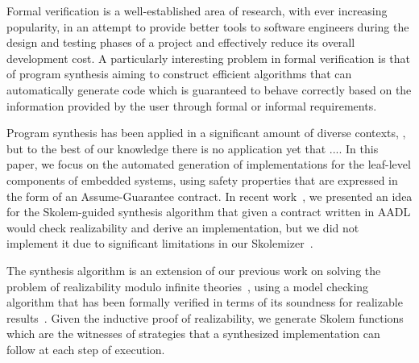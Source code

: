 \iffalse



Formal verification is a well-established area of research, with ever increasing
popularity, in an attempt to provide better tools to software engineers during
the design and testing phases of a project and effectively reduce its overall
development cost. A particularly interesting problem in formal verification  is
that of program synthesis aiming to construct efficient algorithms that can
automatically generate code which is guaranteed to behave correctly based on the
information provided by the user through formal or informal requirements.

Program synthesis has been applied in a significant amount of
diverse contexts, , but to the best of our knowledge there is no application yet that ....%
In this paper, we focus on the automated
generation of implementations for the leaf-level components of embedded
systems, using safety properties that are expressed in the form of an
Assume-Guarantee contract.
In recent work~\cite{katis2016towards}, we presented an idea for the Skolem-guided synthesis algorithm
that given a contract written in AADL would check realizability and derive an implementation,
but we did not implement it due to significant limitations in our Skolemizer~\cite{fedyukovich2015automated}.

The synthesis algorithm is an extension of our previous work on solving the problem of
realizability modulo infinite theories~\cite{Katis15:Realizability}, using a
model checking algorithm that has been formally verified in terms of its soundness for realizable
results~\cite{katis2015machine}.
 Given the inductive proof of realizability, we generate Skolem functions which are the
witnesses of strategies that a synthesized implementation can follow at each
step of execution.

